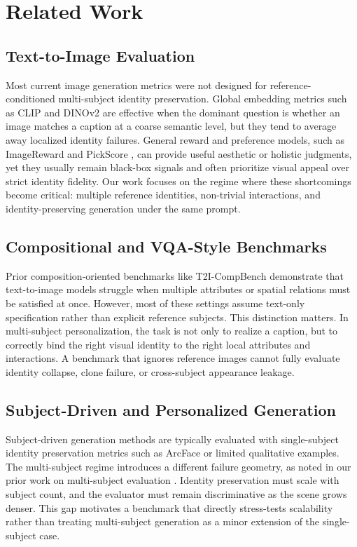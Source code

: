 \section{Related Work}

\subsection{Text-to-Image Evaluation}
Most current image generation metrics were not designed for reference-conditioned multi-subject identity preservation. Global embedding metrics such as CLIP \cite{radford2021learning} and DINOv2 \cite{oquab2023dinov2} are effective when the dominant question is whether an image matches a caption at a coarse semantic level, but they tend to average away localized identity failures. General reward and preference models, such as ImageReward \cite{xu2023imagereward} and PickScore \cite{kirstain2023pick}, can provide useful aesthetic or holistic judgments, yet they usually remain black-box signals and often prioritize visual appeal over strict identity fidelity. Our work focuses on the regime where these shortcomings become critical: multiple reference identities, non-trivial interactions, and identity-preserving generation under the same prompt.

\subsection{Compositional and VQA-Style Benchmarks}
Prior composition-oriented benchmarks like T2I-CompBench \cite{huang2023t2i} demonstrate that text-to-image models struggle when multiple attributes or spatial relations must be satisfied at once. However, most of these settings assume text-only specification rather than explicit reference subjects. This distinction matters. In multi-subject personalization, the task is not only to realize a caption, but to correctly bind the right visual identity to the right local attributes and interactions. A benchmark that ignores reference images cannot fully evaluate identity collapse, clone failure, or cross-subject appearance leakage.

\subsection{Subject-Driven and Personalized Generation}
Subject-driven generation methods are typically evaluated with single-subject identity preservation metrics such as ArcFace \cite{deng2019arcface} or limited qualitative examples. The multi-subject regime introduces a different failure geometry, as noted in our prior work on multi-subject evaluation \cite{chen2024multisubject}. Identity preservation must scale with subject count, and the evaluator must remain discriminative as the scene grows denser. This gap motivates a benchmark that directly stress-tests scalability rather than treating multi-subject generation as a minor extension of the single-subject case.

